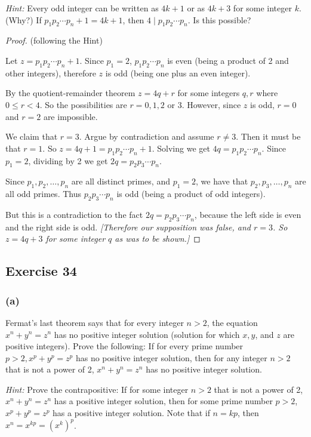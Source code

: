 \documentclass[14pt]{extarticle}
\begin{document}
{\it Hint:} Every odd integer can be written as $4k + 1$ or as $4k + 3$ for some integer $k$. (Why?) If $p_1 p_2 \cdots p_n + 1 = 4k + 1$, then $4 \mid p_1 p_2 \cdots p_n$. Is this possible?

\begin{proof}
(following the Hint)

Let $z = p_1 p_2 \cdots p_n + 1$. Since $p_1 = 2$, $p_1 p_2 \cdots p_n$ is even (being a product of 2 and other integers), therefore $z$ is odd (being one plus an even integer).

By the quotient-remainder theorem $z = 4q+r$ for some integers $q,r$ where $0 \leq r < 4$. So the possibilities are $r = 0,1,2$ or 3. However, since $z$ is odd, $r = 0$ and $r = 2$ are impossible.

We claim that $r = 3$. Argue by contradiction and assume $r \neq 3$. Then it must be that $r = 1$. So $z = 4q+1 = p_1 p_2 \cdots p_n + 1$. Solving we get $4q = p_1 p_2 \cdots p_n$. Since $p_1 = 2$, dividing by 2 we get $2q = p_2 p_3 \cdots p_n$. 

Since $p_1, p_2, \ldots, p_n$ are all distinct primes, and $p_1 = 2$, we have that $p_2, p_3, \ldots, p_n$ are all odd primes. Thus $p_2 p_3 \cdots p_n$ is odd (being a product of odd integers).

But this is a contradiction to the fact $2q = p_2 p_3 \cdots p_n$, because the left side is even and the right side is odd. {\it [Therefore our supposition was false, and $r = 3$. So $z = 4q+3$ for some integer $q$ as was to be shown.]}
\end{proof}

\subsection{Exercise 34}
\subsubsection{(a)}
Fermat’s last theorem says that for every integer $n > 2$, the equation $x^n + y^n = z^n$ has no positive integer solution (solution for which $x, y$, and $z$ are positive integers). Prove the following: If for every prime number $p > 2, x^p + y^p = z^p$ has no positive integer solution,
then for any integer $n > 2$ that is not a power of 2, $x^n + y^n = z^n$ has no positive integer solution.

{\it Hint:} Prove the contrapositive: If for some integer $n > 2$ that is not a power of 2, $x^n + y^n = z^n$ has a positive integer solution, then for some prime number $p > 2$, $x^p + y^p = z^p$ has a positive integer solution. Note that if $n = kp$, then $x^n = x^{kp} = (x^k)^p$.
\end{document}
